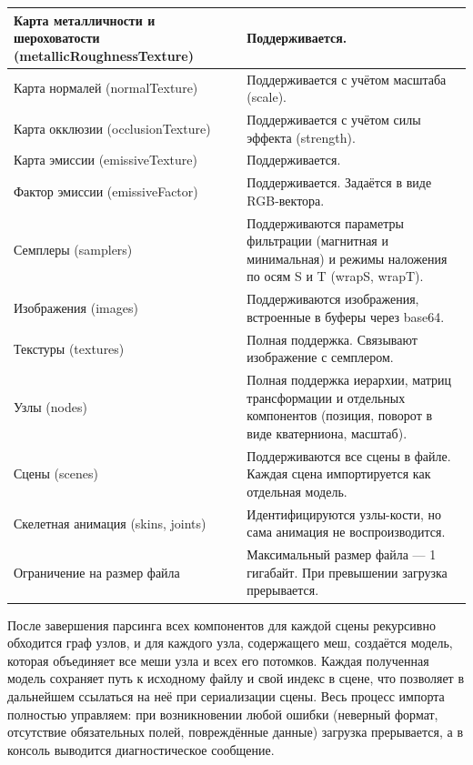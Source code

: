 \begin{xltabular}{\textwidth}{|>{\raggedright\arraybackslash}p{6cm}|>{\raggedright\arraybackslash}X|}
	\hline
	Карта металличности и шероховатости (metallicRoughnessTexture) & Поддерживается. \\
	\hline
	Карта нормалей (normalTexture) & Поддерживается с учётом масштаба (scale). \\
	\hline
	Карта окклюзии (occlusionTexture) & Поддерживается с учётом силы эффекта (strength). \\
	\hline
	Карта эмиссии (emissiveTexture) & Поддерживается. \\
	\hline
	Фактор эмиссии (emissiveFactor) & Поддерживается. Задаётся в виде RGB-вектора. \\
	\hline
	Семплеры (samplers) & Поддерживаются параметры фильтрации (магнитная и минимальная) и режимы наложения по осям S и T (wrapS, wrapT). \\
	\hline
	Изображения (images) & Поддерживаются изображения, встроенные в буферы через base64. \\
	\hline
	Текстуры (textures) & Полная поддержка. Связывают изображение с семплером. \\
	\hline
	Узлы (nodes) & Полная поддержка иерархии, матриц трансформации и отдельных компонентов (позиция, поворот в виде кватерниона, масштаб). \\
	\hline
	Сцены (scenes) & Поддерживаются все сцены в файле. Каждая сцена импортируется как отдельная модель. \\
	\hline
	Скелетная анимация (skins, joints) & Идентифицируются узлы-кости, но сама анимация не воспроизводится. \\
	\hline
	Ограничение на размер файла & Максимальный размер файла — 1 гигабайт. При превышении загрузка прерывается. \\
	\hline
\end{xltabular}

После завершения парсинга всех компонентов для каждой сцены рекурсивно обходится граф узлов, и для каждого узла, содержащего меш, создаётся модель, которая объединяет все меши узла и всех его потомков. Каждая полученная модель сохраняет путь к исходному файлу и свой индекс в сцене, что позволяет в дальнейшем ссылаться на неё при сериализации сцены. Весь процесс импорта полностью управляем: при возникновении любой ошибки (неверный формат, отсутствие обязательных полей, повреждённые данные) загрузка прерывается, а в консоль выводится диагностическое сообщение.

